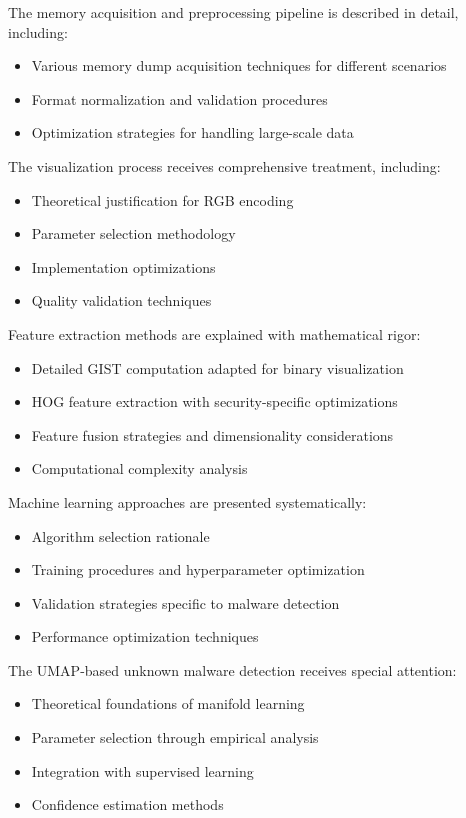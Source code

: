 The memory acquisition and preprocessing pipeline is described in detail, including:
\begin{itemize}
\item Various memory dump acquisition techniques for different scenarios
\item Format normalization and validation procedures
\item Optimization strategies for handling large-scale data
\end{itemize}

The visualization process receives comprehensive treatment, including:
\begin{itemize}
\item Theoretical justification for RGB encoding
\item Parameter selection methodology
\item Implementation optimizations
\item Quality validation techniques
\end{itemize}

Feature extraction methods are explained with mathematical rigor:
\begin{itemize}
\item Detailed GIST computation adapted for binary visualization
\item HOG feature extraction with security-specific optimizations
\item Feature fusion strategies and dimensionality considerations
\item Computational complexity analysis
\end{itemize}

Machine learning approaches are presented systematically:
\begin{itemize}
\item Algorithm selection rationale
\item Training procedures and hyperparameter optimization
\item Validation strategies specific to malware detection
\item Performance optimization techniques
\end{itemize}

The UMAP-based unknown malware detection receives special attention:
\begin{itemize}
\item Theoretical foundations of manifold learning
\item Parameter selection through empirical analysis
\item Integration with supervised learning
\item Confidence estimation methods
\end{itemize}

